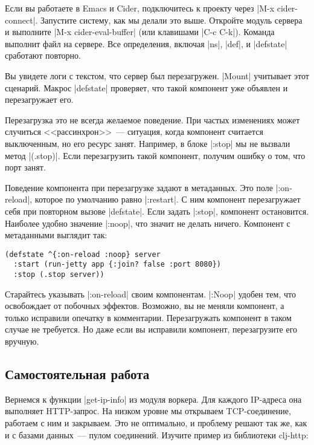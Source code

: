 Если вы работаете в Emacs и Cider, подключитесь к проекту через
\spverb|M-x cider-connect|. Запустите систему, как мы делали это выше. Откройте модуль
сервера и выполните \spverb|M-x cider-eval-buffer| (или клавишами
\spverb|C-c C-k|). Команда выполнит файл на сервере. Все определения, включая \spverb|ns|,
\spverb|def|, и \spverb|defstate| сработают повторно.

Вы увидете логи с текстом, что сервер был перезагружен. \spverb|Mount| учитывает
этот сценарий. Макрос \spverb|defstate| проверяет, что такой компонент уже
объявлен и перезагружает его.

Перезагрузка это не всегда желаемое поведение. При частых изменениях может
случиться <<рассинхрон>>~--- ситуация, когда компонент считается выключенным, но
его ресурс занят. Например, в блоке \spverb|:stop| мы не вызвали метод
\spverb|(.stop)|. Если перезагрузить такой компонент, получим ошибку о том, что
порт занят.

Поведение компонента при перезагрузке задают в метаданных. Это поле
\spverb|:on-reload|, которое по умолчанию равно \spverb|:restart|. С ним
компонент перезагружает себя при повторном вызове \spverb|defstate|. Если задать
\spverb|:stop|, компонент остановится. Наиболее удобно значение \spverb|:noop|,
что значит не делать ничего. Компонент с метаданными выглядит так:

\begin{verbatim}
(defstate ^{:on-reload :noop} server
  :start (run-jetty app {:join? false :port 8080})
  :stop (.stop server))
\end{verbatim}

Старайтесь указывать \spverb|:on-reload| своим компонентам. \spverb|:Noop|
удобен тем, что освобождает от побочных эффектов. Возможно, вы не меняли
компонент, а только исправили опечатку в комментарии. Перезагружать компонент в
таком случае не требуется. Но даже если вы исправили компонент, перезагрузите
его вручную.

\subsection{Самостоятельная работа}

Вернемся к функции \spverb|get-ip-info| из модуля воркера. Для каждого IP-адреса
она выполняет HTTP-запрос. На низком уровне мы открываем TCP-соединение,
работаем с ним и закрываем. Это не оптимально, и проблему решают так же, как и с
базами данных~--- пулом соединений. Изучите пример из библиотеки
clj-http:

